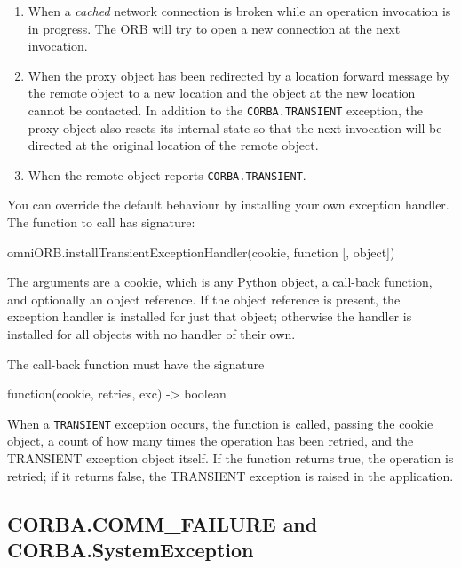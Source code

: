 \documentclass[11pt,twoside,a4paper]{book}
\newcommand{\code}[1]{\texttt{#1}}
\begin{document}
\begin{enumerate}

\item When a \emph{cached} network connection is broken while an
operation invocation is in progress. The ORB will try to open a new
connection at the next invocation.

\item When the proxy object has been redirected by a location forward
message by the remote object to a new location and the object at the
new location cannot be contacted. In addition to the
\code{CORBA.TRANSIENT} exception, the proxy object also resets its
internal state so that the next invocation will be directed at the
original location of the remote object.

\item When the remote object reports \code{CORBA.TRANSIENT}.

\end{enumerate}

You can override the default behaviour by installing your own
exception handler. The function to call has signature:

\begin{pylisting}
omniORB.installTransientExceptionHandler(cookie, function [, object])
\end{pylisting}

The arguments are a cookie, which is any Python object, a call-back
function, and optionally an object reference. If the object reference
is present, the exception handler is installed for just that object;
otherwise the handler is installed for all objects with no handler of
their own.

The call-back function must have the signature

\begin{pylisting}
function(cookie, retries, exc) -> boolean
\end{pylisting}

When a \code{TRANSIENT} exception occurs, the function is called,
passing the cookie object, a count of how many times the operation has
been retried, and the TRANSIENT exception object itself. If the
function returns true, the operation is retried; if it returns false,
the TRANSIENT exception is raised in the application.



\subsection{CORBA.COMM\_FAILURE and CORBA.SystemException}
\end{document}
